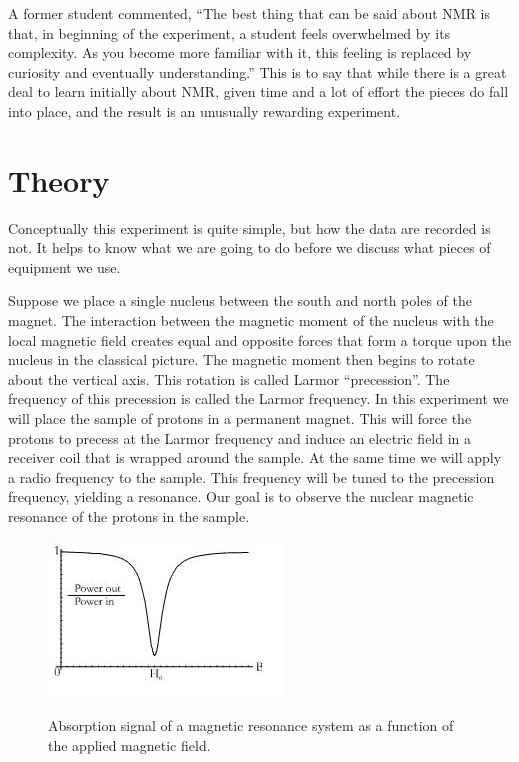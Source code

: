 \documentclass{../lab}
\begin{document}
A former student commented, ``The best thing that can be said about NMR is that, in beginning of the experiment, a student feels overwhelmed by its complexity. As you become more familiar with it, this feeling is replaced by curiosity and eventually understanding.'' This is to say that while there is a great deal to learn initially about NMR, given time and a lot of effort the pieces do fall into place, and the result is an unusually rewarding experiment.

\section{Theory}

Conceptually this experiment is quite simple, but how the data are recorded is not. It helps to know what we are going to do before we discuss what pieces of equipment we use.

Suppose we place a single nucleus between the south and north poles of the magnet. The interaction between the magnetic moment of the nucleus with the local magnetic field creates equal and opposite forces that form a torque upon the nucleus in the classical picture. The magnetic moment then begins to rotate about the vertical axis. This rotation is called Larmor ``precession''. The frequency of this precession is called the Larmor frequency. In this experiment we will place the sample of protons in a permanent magnet. This will force the protons to precess at the Larmor frequency and induce an electric field in a receiver coil that is wrapped around the sample. At the same time we will apply a radio frequency to the sample. This frequency will be tuned to the precession frequency, yielding a resonance. Our goal is to observe the nuclear magnetic resonance of the protons in the sample.

\begin{figure}[h]
    \centering
    \href{http://experimentationlab.berkeley.edu/sites/default/files/images/NMR1.jpg}{\includegraphics[width=0.3\linewidth]{images/NMR1.jpg}}
    \caption{Absorption signal of a magnetic resonance system as a function of the applied magnetic field.}
    \label{fig:AbsorptionSignal}
\end{figure}
\end{document}
